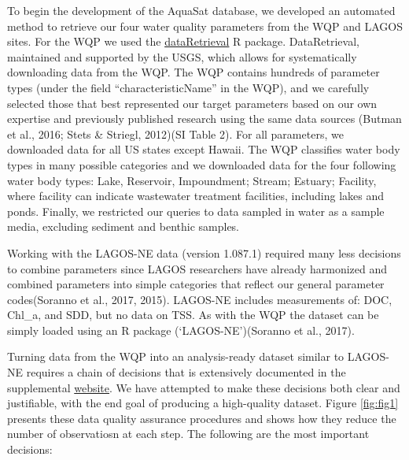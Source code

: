 \documentclass[]{article}
\begin{document}
To begin the development of the AquaSat database, we developed an
automated method to retrieve our four water quality parameters from the
WQP and LAGOS sites. For the WQP we used the
\href{https://github.com/USGS-R/dataRetrieval}{dataRetrieval} R package.
DataRetrieval, maintained and supported by the USGS, which allows for
systematically downloading data from the WQP. The WQP contains hundreds
of parameter types (under the field ``characteristicName'' in the WQP),
and we carefully selected those that best represented our target
parameters based on our own expertise and previously published research
using the same data sources (Butman et al., 2016; Stets \& Striegl,
2012)(SI Table 2). For all parameters, we downloaded data for all US
states except Hawaii. The WQP classifies water body types in many
possible categories and we downloaded data for the four following water
body types: Lake, Reservoir, Impoundment; Stream; Estuary; Facility,
where facility can indicate wastewater treatment facilities, including
lakes and ponds. Finally, we restricted our queries to data sampled in
water as a sample media, excluding sediment and benthic samples.

Working with the LAGOS-NE data (version 1.087.1) required many less
decisions to combine parameters since LAGOS researchers have already
harmonized and combined parameters into simple categories that reflect
our general parameter codes(Soranno et al., 2017, 2015). LAGOS-NE
includes measurements of: DOC, Chl\_a, and SDD, but no data on TSS. As
with the WQP the dataset can be simply loaded using an R package
(`LAGOS-NE')(Soranno et al., 2017).

Turning data from the WQP into an analysis-ready dataset similar to
LAGOS-NE requires a chain of decisions that is extensively documented in
the supplemental \href{link}{website}. We have attempted to make these
decisions both clear and justifiable, with the end goal of producing a
high-quality dataset. Figure \ref{fig:fig1} presents these data quality
assurance procedures and shows how they reduce the number of
observatiosn at each step. The following are the most important
decisions:
\end{document}
